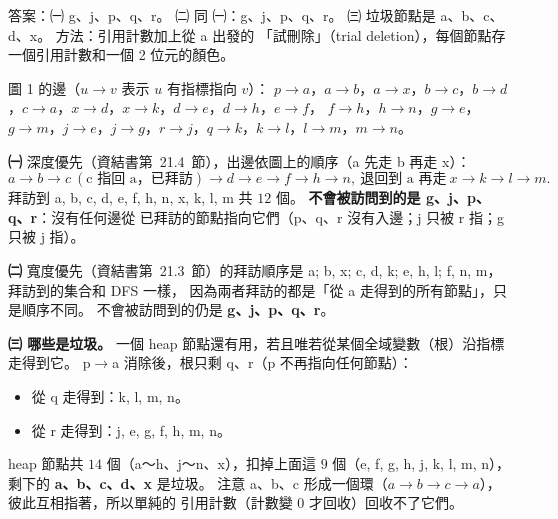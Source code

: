 \begin{pastsoln}
答案：㈠ g、j、p、q、r。 ㈡ 同 ㈠：g、j、p、q、r。 ㈢ 垃圾節點是 a、b、c、d、x。 方法：引用計數加上從 a 出發的
「試刪除」（trial deletion），每個節點存一個引用計數和一個 2 位元的顏色。

圖 1 的邊（$u \to v$ 表示 $u$ 有指標指向 $v$）：
$p\to a$，$a \to b$，$a \to x$，$b \to c$，$b \to d$，$c \to a$，$x \to d$，$x \to k$，$d \to e$，$d \to h$，$e \to f$，
$f \to h$，$h \to n$，$g \to e$，$g \to m$，$j \to e$，$j \to g$，$r \to j$，$q \to k$，$k \to l$，$l \to m$，$m \to n$。

\textbf{㈠} 深度優先（資結書第~21.4~節），出邊依圖上的順序（a 先走 b 再走 x）：
\[
a \to b \to c\ (\text{c 指回 a，已拜訪}) \to d \to e \to f \to h \to n,\ \text{退回到 a 再走}\ x \to k \to l \to m .
\]
拜訪到 a, b, c, d, e, f, h, n, x, k, l, m 共 $12$ 個。 \textbf{不會被訪問到的是 g、j、p、q、r}：沒有任何邊從
已拜訪的節點指向它們（p、q、r 沒有入邊；j 只被 r 指；g 只被 j 指）。

\textbf{㈡} 寬度優先（資結書第~21.3~節）的拜訪順序是 a; b, x; c, d, k; e, h, l; f, n, m，拜訪到的集合和 DFS 一樣，
因為兩者拜訪的都是「從 a 走得到的所有節點」，只是順序不同。 不會被訪問到的仍是 \textbf{g、j、p、q、r}。

\textbf{㈢ 哪些是垃圾。} 一個 heap 節點還有用，若且唯若從某個全域變數（根）沿指標走得到它。 p$\to$a 消除後，根只剩
q、r（p 不再指向任何節點）：
\begin{itemize}
\item 從 q 走得到：k, l, m, n。
\item 從 r 走得到：j, e, g, f, h, m, n。
\end{itemize}
heap 節點共 $14$ 個（a～h、j～n、x），扣掉上面這 $9$ 個（e, f, g, h, j, k, l, m, n），剩下的
\textbf{a、b、c、d、x} 是垃圾。 注意 a、b、c 形成一個環（$a \to b \to c \to a$），彼此互相指著，所以單純的
引用計數（計數變 $0$ 才回收）回收不了它們。


\end{pastsoln}
